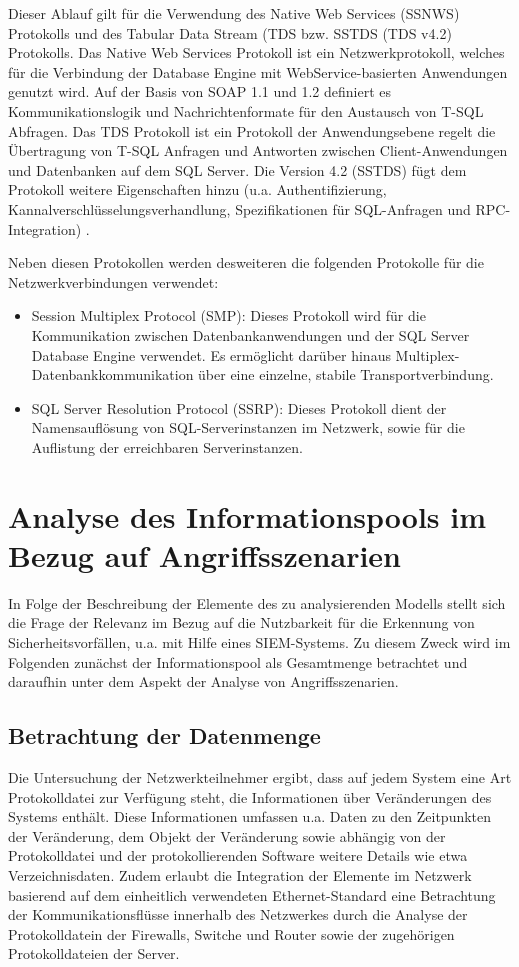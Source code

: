 Dieser Ablauf gilt für die Verwendung des Native Web Services (SSNWS) Protokolls und des Tabular Data Stream (TDS bzw. SSTDS (TDS v4.2) Protokolls. Das Native Web Services Protokoll ist ein Netzwerkprotokoll, welches für die Verbindung der Database Engine mit WebService-basierten Anwendungen genutzt wird. Auf der Basis von SOAP 1.1 und 1.2 definiert es Kommunikationslogik und Nachrichtenformate für den Austausch von T-SQL Abfragen. Das TDS Protokoll ist ein Protokoll der Anwendungsebene regelt die Übertragung von T-SQL Anfragen und Antworten zwischen Client-Anwendungen und Datenbanken auf dem SQL Server. Die Version 4.2 (SSTDS) fügt dem Protokoll weitere Eigenschaften hinzu (u.a. Authentifizierung, Kannalverschlüsselungsverhandlung, Spezifikationen für SQL-Anfragen und RPC-Integration) \citep{SQLProt1}.

Neben diesen Protokollen werden desweiteren die folgenden Protokolle für die Netzwerkverbindungen verwendet:
\begin{itemize}
\item Session Multiplex Protocol (SMP): Dieses Protokoll wird für die Kommunikation zwischen Datenbankanwendungen und der SQL Server Database Engine verwendet. Es ermöglicht darüber hinaus Multiplex-Datenbankkommunikation über eine einzelne, stabile Transportverbindung.
\item SQL Server Resolution Protocol (SSRP): Dieses Protokoll dient der Namensauflösung von SQL-Serverinstanzen im Netzwerk, sowie für die Auflistung der erreichbaren Serverinstanzen.
\end{itemize}
\citep{SQLProt1}


\section{Analyse des Informationspools im Bezug auf Angriffsszenarien}
In Folge der Beschreibung der Elemente des zu analysierenden Modells stellt sich die Frage der Relevanz im Bezug auf die Nutzbarkeit für die Erkennung von Sicherheitsvorfällen, u.a. mit Hilfe eines SIEM-Systems. Zu diesem Zweck wird im Folgenden zunächst der Informationspool als Gesamtmenge betrachtet und daraufhin unter dem Aspekt der Analyse von Angriffsszenarien.

\subsection{Betrachtung der Datenmenge}
Die Untersuchung der Netzwerkteilnehmer ergibt, dass auf jedem System eine Art Protokolldatei zur Verfügung steht, die Informationen über Veränderungen des Systems enthält. Diese Informationen umfassen u.a. Daten zu den Zeitpunkten der Veränderung, dem Objekt der Veränderung sowie abhängig von der Protokolldatei und der protokollierenden Software weitere Details wie etwa Verzeichnisdaten. Zudem erlaubt die Integration der Elemente im Netzwerk basierend auf dem einheitlich verwendeten Ethernet-Standard eine Betrachtung der Kommunikationsflüsse innerhalb des Netzwerkes durch die Analyse der Protokolldatein der Firewalls, Switche und Router sowie der zugehörigen Protokolldateien der Server. 

